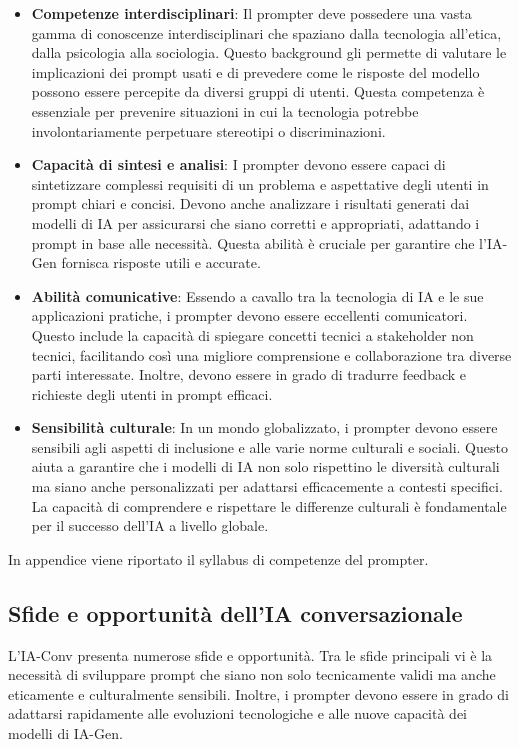         \begin{itemize}
          \item \textbf{Competenze interdisciplinari}: Il prompter deve possedere una vasta gamma di conoscenze interdisciplinari che spaziano dalla tecnologia all'etica, dalla psicologia alla sociologia. Questo background gli permette di valutare le implicazioni dei prompt usati e di prevedere come le risposte del modello possono essere percepite da diversi gruppi di utenti. Questa competenza è essenziale per prevenire situazioni in cui la tecnologia potrebbe involontariamente perpetuare stereotipi o discriminazioni.
          \item \textbf{Capacità di sintesi e analisi}: I prompter devono essere capaci di sintetizzare complessi requisiti di un problema e aspettative degli utenti in prompt chiari e concisi. Devono anche analizzare i risultati generati dai modelli di IA per assicurarsi che siano corretti e appropriati, adattando i prompt in base alle necessità. Questa abilità è cruciale per garantire che l'IA-Gen fornisca risposte utili e accurate.
          \item \textbf{Abilità comunicative}: Essendo a cavallo tra la tecnologia di IA e le sue applicazioni pratiche, i prompter devono essere eccellenti comunicatori. Questo include la capacità di spiegare concetti tecnici a stakeholder non tecnici, facilitando così una migliore comprensione e collaborazione tra diverse parti interessate. Inoltre, devono essere in grado di tradurre feedback e richieste degli utenti in prompt efficaci.
          \item \textbf{Sensibilità culturale}: In un mondo globalizzato, i prompter devono essere sensibili agli aspetti di inclusione e alle varie norme culturali e sociali. Questo aiuta a garantire che i modelli di IA non solo rispettino le diversità culturali ma siano anche personalizzati per adattarsi efficacemente a contesti specifici. La capacità di comprendere e rispettare le differenze culturali è fondamentale per il successo dell'IA a livello globale.
        \end{itemize}
        In appendice viene riportato il syllabus di competenze del prompter.
 
    \subsection{Sfide e opportunità dell’IA conversazionale}
        L’IA-Conv presenta numerose sfide e opportunità. Tra le sfide principali vi è la necessità di sviluppare prompt che siano non solo tecnicamente validi ma anche eticamente e culturalmente sensibili. Inoltre, i prompter devono essere in grado di adattarsi rapidamente alle evoluzioni tecnologiche e alle nuove capacità dei modelli di IA-Gen.
    
